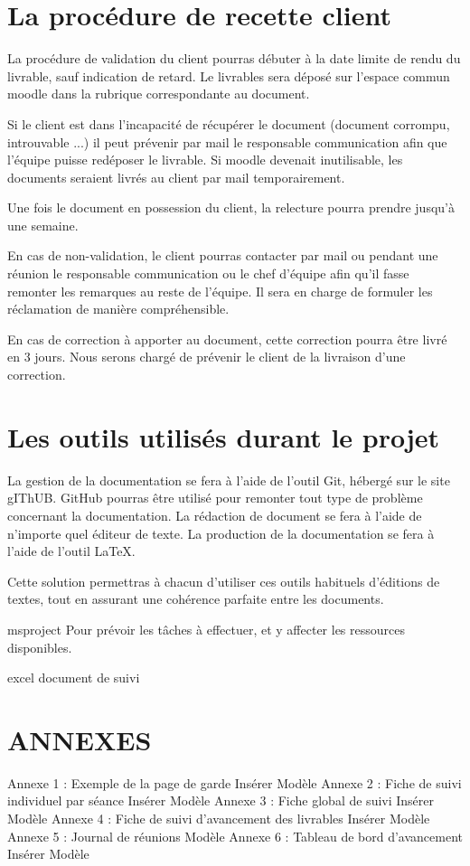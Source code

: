 \section{La procédure de recette client}

La procédure de validation du client pourras débuter à la date limite de rendu du livrable, sauf indication de retard. Le livrables sera déposé sur l'espace commun moodle dans la rubrique correspondante au document.

Si le client est dans l’incapacité de récupérer le document (document corrompu, introuvable ...) il peut prévenir par mail le responsable communication afin que l’équipe puisse redéposer le livrable.
Si moodle devenait inutilisable, les documents seraient livrés au client par mail temporairement.

Une fois le document en possession du client, la relecture pourra prendre jusqu’à une semaine.

En cas de non-validation, le client pourras contacter par mail ou pendant une réunion le responsable communication ou le chef d’équipe afin qu’il fasse remonter les remarques au reste de l’équipe.
Il sera en charge de formuler les réclamation de manière compréhensible.

En cas de correction à apporter au document, cette correction pourra être livré en 3 jours.
Nous serons chargé de prévenir le client de la livraison d’une correction.

\section{Les outils utilisés durant le projet}

La gestion de la documentation se fera à l’aide de l’outil Git, hébergé sur le site gIThUB.
GitHub pourras être utilisé pour remonter tout type de problème concernant la documentation.
La rédaction de document se fera à l’aide de n’importe quel éditeur de texte.
La production de la documentation se fera à l’aide de l'outil LaTeX.

Cette solution permettras à chacun  d’utiliser ces outils habituels d’éditions de textes, tout en assurant une cohérence parfaite entre les documents.

msproject
Pour prévoir les tâches à effectuer, et y affecter les ressources disponibles.

excel document de suivi



\section{ANNEXES}
Annexe 1 : Exemple de la page de garde
    Insérer Modèle
Annexe 2 : Fiche de suivi individuel par séance
    Insérer Modèle
Annexe 3 : Fiche global de suivi
    Insérer Modèle
Annexe 4 : Fiche de suivi d'avancement des livrables
    Insérer Modèle
Annexe 5 : Journal de réunions
    Modèle
Annexe 6 : Tableau de bord d'avancement
    Insérer Modèle
